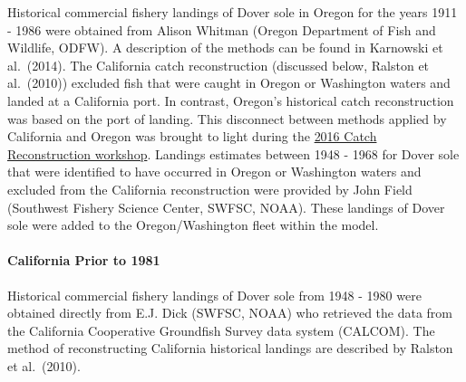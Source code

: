 \documentclass[11pt,
  english,
  a4paper,
]{article}
\begin{document}
Historical commercial fishery landings of Dover sole in Oregon for the years 1911 - 1986 were obtained from Alison Whitman (Oregon Department of Fish and Wildlife, ODFW). A description of the methods can be found in Karnowski et al.~{(2014)\leavevmode\tagmcend\tagstructend}. The California catch reconstruction (discussed below, Ralston et al.~{(2010)\leavevmode\tagmcend\tagstructend}) excluded fish that were caught in Oregon or Washington waters and landed at a California port. In contrast, Oregon's historical catch reconstruction was based on the port of landing. This disconnect between methods applied by California and Oregon was brought to light during the {\href{https://www.pcouncil.org/documents/2017/03/i2_att1_catch_reconstruction_workshop_report_mar2017bb.pdf/}{2016 Catch Reconstruction workshop}\leavevmode\tagmcend\tagstructend}. Landings estimates between 1948 - 1968 for Dover sole that were identified to have occurred in Oregon or Washington waters and excluded from the California reconstruction were provided by John Field (Southwest Fishery Science Center, SWFSC, NOAA). These landings of Dover sole were added to the Oregon/Washington fleet within the model.

\leavevmode\tagmcend\tagstructend\par


\hypertarget{california-prior-to-1981}{%
\paragraph{California Prior to 1981}\label{california-prior-to-1981}}

\leavevmode\tagmcend\tagstructend


Historical commercial fishery landings of Dover sole from 1948 - 1980 were obtained directly from E.J. Dick (SWFSC, NOAA) who retrieved the data from the California Cooperative Groundfish Survey data system (CALCOM). The method of reconstructing California historical landings are described by Ralston et al.~{(2010)\leavevmode\tagmcend\tagstructend}.

\leavevmode\tagmcend\tagstructend\par
\end{document}
